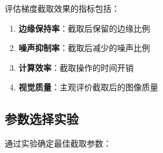 \documentclass{article}
\begin{document}
评估梯度截取效果的指标包括：

\begin{enumerate}
    \item \textbf{边缘保持率}：截取后保留的边缘比例
    \item \textbf{噪声抑制率}：截取后减少的噪声比例
    \item \textbf{计算效率}：截取操作的时间开销
    \item \textbf{视觉质量}：主观评价截取后的图像质量
\end{enumerate}

\subsection{参数选择实验}

通过实验确定最佳截取参数：
\end{document}
